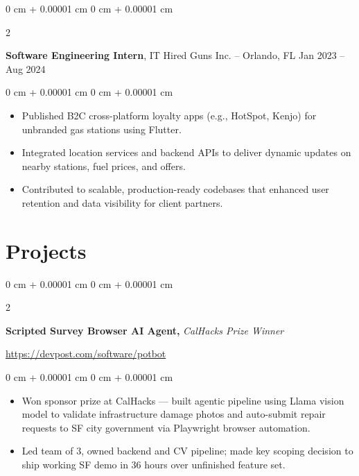 \documentclass[10pt, letterpaper]{article}
\newenvironment{highlights}{
    \begin{itemize}[
        topsep=0.3 cm,
        parsep=0.05 cm,
        partopsep=0pt,
        itemsep=0pt, 
        leftmargin=0 cm + 10pt
    ]
}{
    \end{itemize}
} %
\newenvironment{onecolentry}{
    \begin{adjustwidth}{
        0 cm + 0.00001 cm
    }{
        0 cm + 0.00001 cm
    }
}{
    \end{adjustwidth}
} %
\newenvironment{twocolentry}[2][]{
    \onecolentry
    \def\secondColumn{#2}
    \setcolumnwidth{\fill, 4.5 cm}
    \begin{paracol}{2}
}{
    \switchcolumn \raggedleft \secondColumn
    \end{paracol}
    \endonecolentry
} %
\newenvironment{extendedtwocolentry}[2][]{
    \onecolentry
    \def\secondColumn{#2}
    \setcolumnwidth{\fill, 8 cm}
    \begin{paracol}{2}
}{
    \switchcolumn \raggedleft \secondColumn
    \end{paracol}
    \endonecolentry
}
\begin{document}
        \vspace{0.07 cm}

        \begin{twocolentry}{
            Jan 2023 – Aug 2024
        }
            \textbf{Software Engineering Intern}, IT Hired Guns Inc. -- Orlando, FL\end{twocolentry}

        \vspace{0.07 cm}
        \begin{onecolentry}
            \begin{highlights}
                \item Published B2C cross-platform loyalty apps (e.g., HotSpot, Kenjo) for unbranded gas stations using Flutter.
                \item Integrated location services and backend APIs to deliver dynamic updates on nearby stations, fuel prices, and offers.
                \item Contributed to scalable, production-ready codebases that enhanced user retention and data visibility for client partners.
            \end{highlights}
        \end{onecolentry}

        \vspace{0.07 cm}


        
    
        \section{Projects}
        
        \begin{extendedtwocolentry}{
            \href{https://devpost.com/software/potbot}{https://devpost.com/software/potbot}
        }
            \textbf{Scripted Survey Browser AI Agent,} \textit{CalHacks Prize Winner}
        \end{extendedtwocolentry}

        \vspace{0.07 cm}
        \begin{onecolentry}
            \begin{highlights}
                \item Won sponsor prize at CalHacks — built agentic pipeline using Llama vision model to validate infrastructure damage photos and auto-submit repair requests to SF city government via Playwright browser automation.
                \item Led team of 3, owned backend and CV pipeline; made key scoping decision to ship working SF demo in 36 hours over unfinished feature set.
            \end{highlights}
        \end{onecolentry}
\end{document}
